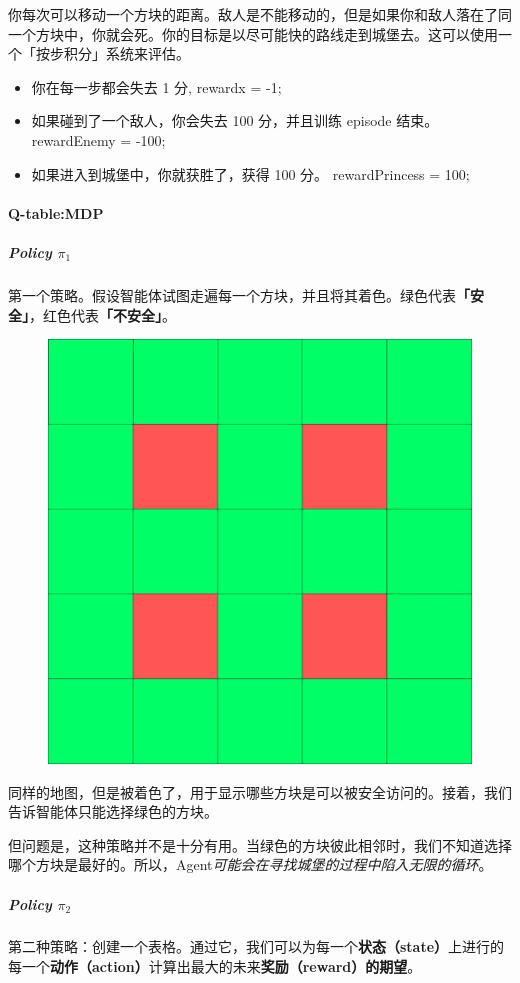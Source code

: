 \documentclass[UTF8,a4paper,12pt]{ctexbook}
\begin{document}
				你每次可以移动一个方块的距离。敌人是不能移动的，但是如果你和敌人落在了同一个方块中，你就会死。你的目标是以尽可能快的路线走到城堡去。这可以使用一个「按步积分」系统来评估。
				
				\begin{itemize}
					\item 你在每一步都会失去 1 分, rewardx = -1;
					\item 如果碰到了一个敌人，你会失去 100 分，并且训练 episode 结束。 rewardEnemy = -100;
					\item 如果进入到城堡中，你就获胜了，获得 100 分。 rewardPrincess = 100;
				\end{itemize}
				
				
			\paragraph{Q-table:MDP}
				\subparagraph{Policy $\pi_1$}
					第一个策略。假设智能体试图走遍每一个方块，并且将其着色。绿色代表\textbf{「安全」}，红色代表\textbf{「不安全」}。
					
					\begin{figure}[H]
						\centering
						\includegraphics[width=.5\linewidth]{policy01}
					\end{figure}
					
					同样的地图，但是被着色了，用于显示哪些方块是可以被安全访问的。接着，我们告诉智能体只能选择绿色的方块。
					
					但问题是，这种策略并不是十分有用。当绿色的方块彼此相邻时，我们不知道选择哪个方块是最好的。所以，Agent\textit{可能会在寻找城堡的过程中陷入无限的循环}。
					
					
				\subparagraph{Policy $\pi_2$}
					第二种策略：创建一个表格。通过它，我们可以为每一个\textbf{状态（state）}上进行的每一个\textbf{动作（action）}计算出最大的未来\textbf{奖励（reward）的期望}。
					
\end{document}
